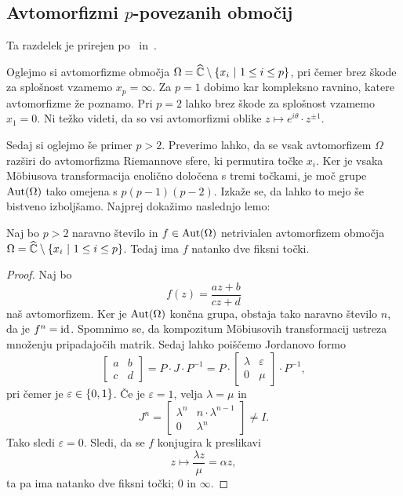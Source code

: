

\subsection{Avtomorfizmi \texorpdfstring{$p$}{p}-povezanih območij}

Ta razdelek je prirejen po~\cite[poglavje 12]{krantz}
in~\cite[razdelek 5.9]{Artin_1991}.

Oglejmo si avtomorfizme območja
$\Omega = \widehat{\mathbb{C}} \setminus \left\{x_i~\middle\vert~1 \leq i \leq p\right\}$, pri čemer
brez škode za splošnost vzamemo $x_p = \infty$. Za $p = 1$ dobimo
kar kompleksno ravnino, katere avtomorfizme že poznamo. Pri $p = 2$
lahko brez škode za splošnost vzamemo $x_1 = 0$. Ni težko videti,
da so vsi avtomorfizmi oblike
$z \mapsto e^{i \theta} \cdot z^{\pm 1}$.

Sedaj si oglejmo še primer $p > 2$. Preverimo lahko, da se vsak
avtomorfizem $\Omega$ razširi do avtomorfizma Riemannove sfere, ki
permutira točke $x_i$. Ker je vsaka Möbiusova transformacija
enolično določena s tremi točkami, je moč grupe $\operatorname{Aut}(\Omega)$ tako
omejena s $p (p-1) (p-2)$. Izkaže se, da lahko to mejo še bistveno
izboljšamo. Najprej dokažimo naslednjo lemo:

\begin{lema}
Naj bo $p > 2$ naravno število in $f \in \operatorname{Aut}(\Omega)$ netrivialen
avtomorfizem območja
$\Omega = \widehat{\mathbb{C}} \setminus \left\{x_i~\middle\vert~1 \leq i \leq p\right\}$. Tedaj ima $f$
natanko dve fiksni točki.
\end{lema}

\begin{proof}
Naj bo
\[
f(z) = \frac{az + b}{cz + d}
\]
naš avtomorfizem. Ker je $\operatorname{Aut}(\Omega)$ končna grupa, obstaja tako
naravno število $n$, da je $f^n = \operatorname{id}$. Spomnimo se, da kompozitum
Möbiusovih transformacij ustreza množenju pripadajočih matrik.
Sedaj lahko poiščemo Jordanovo formo
\[
\begin{bmatrix}
a & b \\
c & d
\end{bmatrix}
=
P \cdot J \cdot P^{-1}
=
P \cdot
\begin{bmatrix}
\lambda & \varepsilon \\
   0    & \mu
\end{bmatrix}
\cdot P^{-1},
\]
pri čemer je $\varepsilon \in \left\{0, 1\right\}$. Če je $\varepsilon = 1$,
velja $\lambda = \mu$ in
\[
J^n =
\begin{bmatrix}
\lambda^n & n \cdot \lambda^{n-1} \\
    0     & \lambda^n
\end{bmatrix}
\ne I.
\]
Tako sledi $\varepsilon = 0$. Sledi, da se $f$ konjugira k
preslikavi
\[
z \mapsto \frac{\lambda z}{\mu} = \alpha z,
\]
ta pa ima natanko dve fiksni točki; $0$ in $\infty$.
\end{proof}

